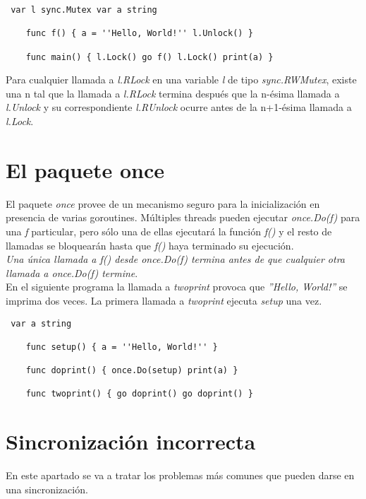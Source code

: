 \begin{verbatim} var l sync.Mutex var a string
    
	func f() { a = ''Hello, World!'' l.Unlock() }
    
	func main() { l.Lock() go f() l.Lock() print(a) } \end{verbatim}

Para cualquier llamada a \textit{l.RLock} en una variable \textit{l} de tipo
\textit{sync.RWMutex}, existe una n tal que la llamada a \textit{l.RLock}
termina después que la n-ésima llamada a \textit{l.Unlock} y su correspondiente
\textit{l.RUnlock} ocurre antes de la n+1-ésima llamada a \textit{l.Lock}.

\section{El paquete once}

El paquete \textit{once} provee de un mecanismo seguro para la inicialización en
presencia de varias goroutines. Múltiples threads pueden ejecutar
\textit{once.Do(f)} para una \textit{f} particular, pero sólo una de ellas
ejecutará la función \textit{f()} y el resto de llamadas se bloquearán hasta que
\textit{f()} haya terminado su ejecución.\\

\textit{Una única llamada a f() desde once.Do(f) termina antes de que cualquier
otra llamada a once.Do(f) termine}.\\

En el siguiente programa la llamada a \textit{twoprint} provoca que
\textit{''Hello, World!''} se imprima dos veces. La primera llamada
a \textit{twoprint} ejecuta \textit{setup} una vez.

\begin{verbatim} var a string
    
	func setup() { a = ''Hello, World!'' }
    
	func doprint() { once.Do(setup) print(a) }
    
	func twoprint() { go doprint() go doprint() } \end{verbatim}

\section{Sincronización incorrecta}

En este apartado se va a tratar los problemas más comunes que pueden darse en
una sincronización.\\

